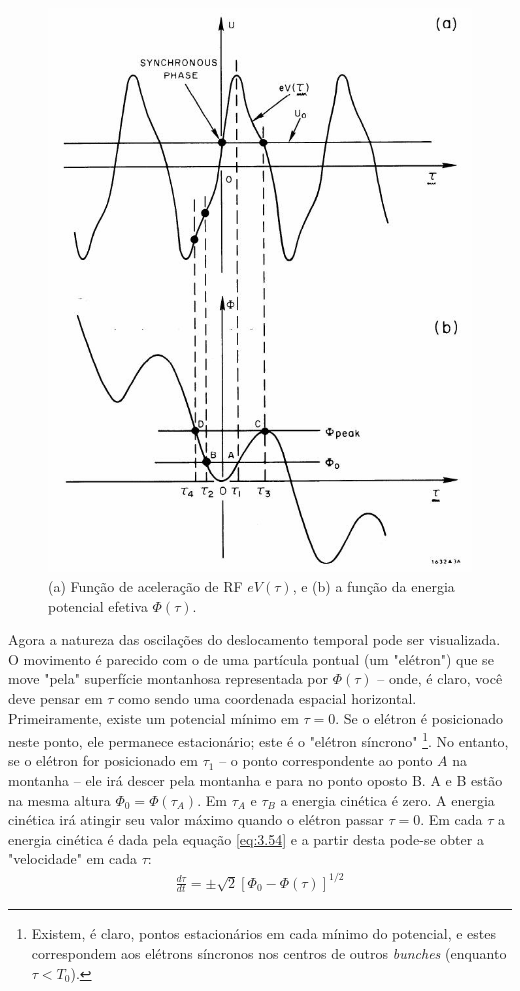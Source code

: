 \begin{figure}[!htb]
	\centering
	\includegraphics[width=0.9\linewidth]{./Figuras/fig36.jpeg}
	\caption{(a) Função de aceleração de RF $eV(\tau)$, e (b) a função da energia potencial efetiva $\Phi(\tau)$.}
	\label{fig:fig36}
\end{figure}

Agora a natureza das oscilações do deslocamento temporal pode ser visualizada. O movimento é parecido com o de uma partícula pontual (um "elétron") que se move "pela" superfície montanhosa representada por $\Phi(\tau)$ -- onde, é claro, você deve pensar em $\tau$ como sendo uma coordenada espacial horizontal. Primeiramente, existe um potencial mínimo em $\tau=0$. Se o elétron é posicionado neste ponto, ele permanece estacionário; este é o "elétron síncrono" \footnote{Existem, é claro, pontos estacionários em cada mínimo do potencial, e estes correspondem aos elétrons síncronos nos centros de outros \textit{bunches} (enquanto $\tau<T_0$).}. No entanto, se o elétron for posicionado em $\tau_1$ -- o ponto correspondente ao ponto $A$ na montanha -- ele irá descer pela montanha e para no ponto oposto B. A e B estão na mesma altura $\Phi_0 = \Phi(\tau_A)$. Em $\tau_A$ e $\tau_B$ a energia cinética é zero. A energia cinética irá atingir seu valor máximo quando o elétron passar $\tau=0$. Em cada $\tau$ a energia cinética é dada pela equação \eqref{eq:3.54} e a partir desta pode-se obter a "velocidade" em cada $\tau$:
\begin{align}
	\frac{d\tau}{dt} = \pm \sqrt{2}[\Phi_0 - \Phi(\tau)]^{1/2}
\end{align}

